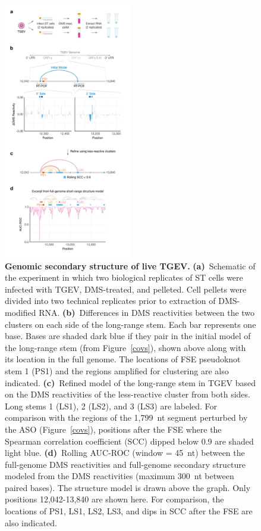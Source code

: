 \documentclass[main.tex]{subfiles}
\begin{document}
\begin{figure}[H]
	\includegraphics[width=0.5\textwidth]{../MainFigures/tgev/tgev.png}
	\caption{\textbf{Genomic secondary structure of live TGEV.} \textbf{(a)}~Schematic of the experiment in which two biological replicates of ST cells were infected with TGEV, DMS-treated, and pelleted. Cell pellets were divided into two technical replicates prior to extraction of DMS-modified RNA. \textbf{(b)}~Differences in DMS reactivities between the two clusters on each side of the long-range stem. Each bar represents one base. Bases are shaded dark blue if they pair in the initial model of the long-range stem (from Figure~\ref{covs}), shown above along with its location in the full genome. The locations of FSE pseudoknot stem 1 (PS1) and the regions amplified for clustering are also indicated. \textbf{(c)}~Refined model of the long-range stem in TGEV based on the DMS reactivities of the less-reactive cluster from both sides. Long stems 1 (LS1), 2 (LS2), and 3 (LS3) are labeled. For comparison with the regions of the 1,799~nt segment perturbed by the ASO (Figure~\ref{covs}), positions after the FSE where the Spearman correlation coefficient (SCC) dipped below 0.9 are shaded light blue. \textbf{(d)}~Rolling AUC-ROC (window = 45~nt) between the full-genome DMS reactivities and full-genome secondary structure modeled from the DMS reactivities (maximum 300~nt between paired bases). The structure model is drawn above the graph. Only positions 12,042-13,840 are shown here. For comparison, the locations of PS1, LS1, LS2, LS3, and dips in SCC after the FSE are also indicated.}
	\label{tgev}
\end{figure}
\end{document}
